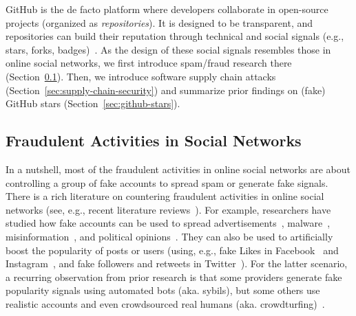 GitHub is the de facto platform where developers collaborate in open-source projects (organized as \emph{repositories}).
It is designed to be transparent, and repositories can build their reputation through technical and social signals (e.g., stars, forks, badges)~\cite{DBLP:conf/icse/TrockmanZKV18, DBLP:conf/icse/TsayDH14}.
As the design of these social signals resembles those in online social networks, we first introduce spam/fraud research there (Section~\ref{sec:fake-activity}).
Then, we introduce software supply chain attacks (Section~\ref{sec:supply-chain-security}) and summarize prior findings on (fake) GitHub stars (Section~\ref{sec:github-stars}).

\subsection{Fraudulent Activities in Social Networks}
\label{sec:fake-activity}

In a nutshell, most of the fraudulent activities in online social networks are about controlling a group of fake accounts to spread spam or generate fake signals.
There is a rich literature on countering fraudulent activities in online social networks (see, e.g., recent literature reviews~\cite{DBLP:journals/eswa/Latah20, DBLP:journals/eswa/RaoVB21, DBLP:journals/snam/AljabriZSASA23}).
For example, researchers have studied how fake accounts can be used to spread advertisements~\cite{DBLP:conf/imc/ThomasGSP11}, malware~\cite{DBLP:conf/ccs/GrierTPZ10}, misinformation~\cite{shao2018spread}, and political opinions~\cite{faris2017partisanship, pierri2020investigating}.
They can also be used to artificially boost the popularity of posts or users (using, e.g., fake Likes in Facebook~\cite{DBLP:conf/www/BeutelXGPF13, DBLP:journals/tissec/IkramOFCFJKS17} and Instagram~\cite{DBLP:conf/websci/SenAMSKD18}, and fake followers and retweets in Twitter~\cite{DBLP:conf/imc/StringhiniWEKVZZ13, DBLP:conf/ccs/SongLK15}).
For the latter scenario, a recurring observation from prior research is that some providers generate fake popularity signals using automated bots (aka. sybils), but some others use realistic accounts and even crowdsourced real humans (aka. crowdturfing)~\cite{DBLP:conf/imc/StringhiniWEKVZZ13, DBLP:conf/www/WangWZZMZZ12,DBLP:journals/tkdd/YangWWGZD14, DBLP:conf/ccs/SongLK15, DBLP:journals/tissec/IkramOFCFJKS17}. 


